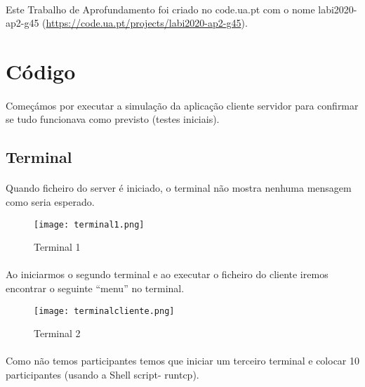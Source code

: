 \documentclass[a4paper,11pt,onecolumn,oneside]{article}
\begin{document}
\paragraph{ } 
Este Trabalho de Aprofundamento foi criado no code.ua.pt com o nome labi2020-ap2-g45 (\url{https://code.ua.pt/projects/labi2020-ap2-g45}).

\newpage

{\center \section{Código}}

\paragraph{ }
Começámos por executar a simulação da aplicação cliente servidor para confirmar se tudo funcionava como previsto (testes iniciais).

\subsection{Terminal}
\paragraph{ }
Quando ficheiro do server é iniciado, o terminal não mostra nenhuma mensagem como seria esperado.

\begin{figure} [h]
\center
\texttt{[image: terminal1.png]}
\caption{Terminal 1}
\label{terminal1}
\end{figure}

\paragraph{ }

Ao iniciarmos o segundo terminal e ao executar o ficheiro do cliente iremos encontrar o seguinte “menu” no terminal.

\begin{figure} [h]
\center
\texttt{[image: terminalcliente.png]}
\caption{Terminal 2}
\label{terminal2}
\end{figure}

\paragraph{ }
Como não temos participantes temos que iniciar um terceiro terminal e colocar 10 participantes (usando a Shell script- run\textunderscore tcp).
\end{document}
